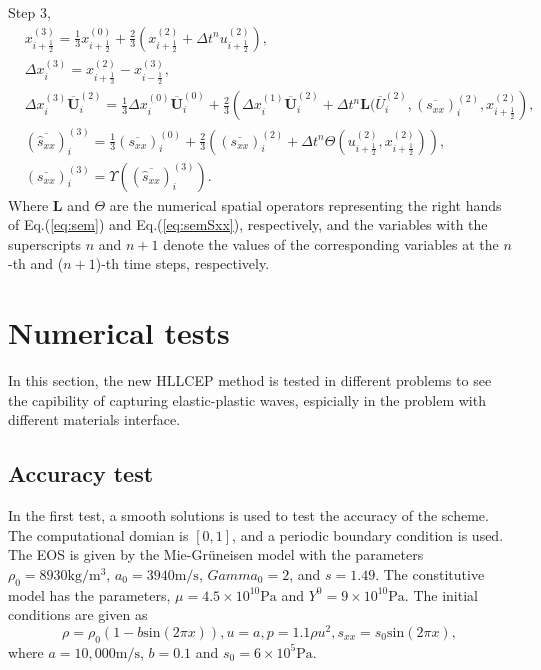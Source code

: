 \documentclass{article}
\numberwithin{equation}{section}
\numberwithin{table}{section}
\begin{document}
Step 3, 
\begin{equation}
  \begin{aligned}
	& x_{i+\frac{1}{2}}^{(3)} = \frac{1}{3} x_{i+\frac{1}{2}}^{(0)}+\frac{2}{3} \left( x_{i+\frac{1}{2}}^{(2)}+\Delta t^n u_{i+\frac{1}{2}}^{(2)}\right),\\
	& \Delta x_i^{(3)} =  x_{i+\frac{1}{3}}^{(2)}- x_{i-\frac{1}{2}}^{(3)},\\
	& \Delta x_i^{(3)} \overline{\bm{U}}_i^{(2)}  = \frac{1}{3} \Delta x_i^{(0)} \overline{\bm{U}}_i^{(0)}+ \frac{2}{3} \left(  \Delta x_i^{(1)} \overline{\bm{U}}_i^{(2)} + \Delta t^n \bm{L}(\overline{U}_i^{(2)}, (\overline{s_{xx}})_i^{(2)}, x_{i+\frac{1}{2}}^{(2)} \right),\\
	& (\overline{\hat{s}_{xx}})_i^{(3)} =\frac{1}{3} (\overline{s_{xx}})_i^{(0)} + \frac{2}{3} \left(  (\overline{s_{xx}})_i^{(2)}+\Delta t^ n \varTheta (u_{i+\frac{1}{2}}^{(2)}, x_{i+\frac{1}{2}}^{(2)})\right),\\
  & (\overline{s_{xx}})_i^{(3)} = \Upsilon((\overline{\hat{s}_{xx}})_i^{(3)}).
\end{aligned}
\end{equation}
Where $\bm{L}$ and $\varTheta$ are the numerical spatial operators representing the right hands of Eq.(\ref{eq:sem}) and Eq.(\ref{eq:semSxx}), respectively, and the variables with the superscripts $n$ and $n+1$ denote the values of the corresponding variables at the $n$-th and ($n+1$)-th time steps, respectively.

\section{Numerical tests}
In this section, the new HLLCEP method  is tested  in different problems to see the capibility of  capturing elastic-plastic waves, espicially in the problem  with different materials interface. 

\subsection{Accuracy test}
In the first test, a smooth solutions is used to test the accuracy of the scheme. The computational domian is $[0,1]$, and a periodic boundary condition is used. The EOS is given by the Mie-Gr\"uneisen model with the parameters $\rho_0 = 8930 \text{kg}/\text{m}^3$, $a_0 = 3940 \text{m}/\text{s}$, $Gamma_0 =2$, and $s=1.49$. The constitutive model has the parameters, $\mu = 4.5\times 10^10 \text{Pa}$ and $Y^0 = 9\times 10^10 \text{Pa}$.  The initial conditions are given as 
\begin{equation}
  \rho = \rho_0(1-b \text{sin}(2\pi x)), u = a, p = 1.1\rho u^2, s_{xx} = s_0 \text{sin}(2\pi x),
\end{equation}
where $a = 10,000\text{m}/\text{s}$, $ b = 0.1$  and  $s_0 = 6\times 10^5 \text{Pa}$.
\end{document}
